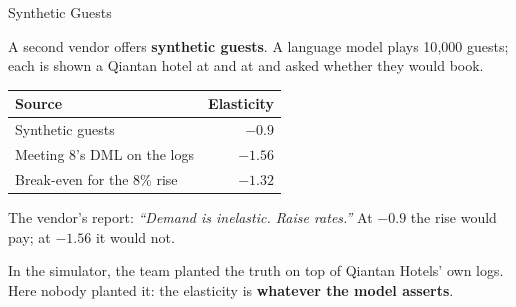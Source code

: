 \documentclass[aspectratio=169, 11pt, handout]{beamer}
\begin{document}
\begin{frame}{Synthetic Guests}

A second vendor offers \textbf{synthetic guests}. A language model plays 10{,}000 guests; each is shown a Qiantan hotel at  and at  and asked whether they would book.

\begin{center}
\begin{tabular}{lr}
\toprule
\textbf{Source} & \textbf{Elasticity} \\
\midrule
Synthetic guests & $-0.9$ \\
Meeting 8's DML on the logs & $-1.56$ \\
Break-even for the 8\% rise & $-1.32$ \\
\bottomrule
\end{tabular}
\end{center}

\medskip

The vendor's report: \emph{``Demand is inelastic. Raise rates.''} At $-0.9$ the rise would pay; at $-1.56$ it would not.

\bigskip

In the simulator, the team planted the truth on top of Qiantan Hotels' own logs. Here nobody planted it: the elasticity is \textbf{whatever the model asserts}.
\end{frame}
\end{document}

